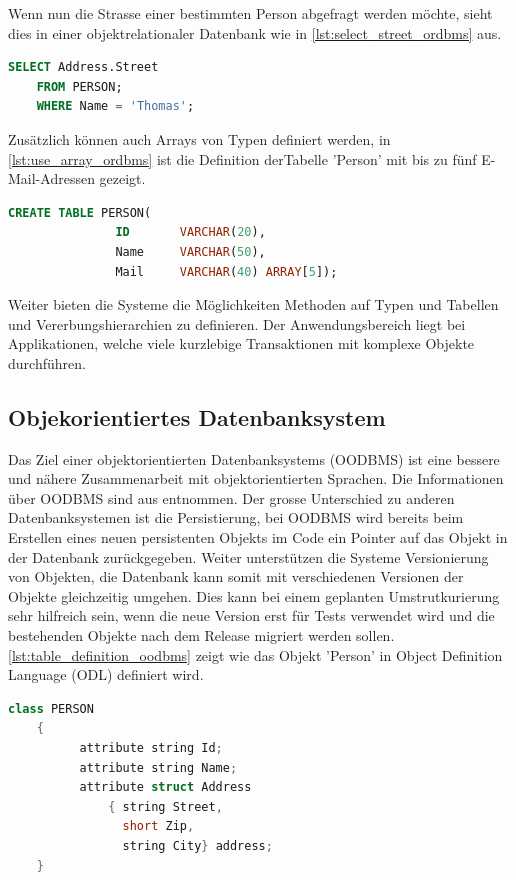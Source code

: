 Wenn nun die Strasse einer bestimmten Person abgefragt werden möchte, sieht dies in einer objektrelationaler Datenbank wie in \autoref{lst:select_street_ordbms} aus.

\begin{lstlisting}[language=SQL, caption=Abfrage in objektrelationalem Datenbanksystem, label=lst:select_street_ordbms]  
    SELECT Address.Street
    FROM PERSON;
    WHERE Name = 'Thomas';
\end{lstlisting}

Zusätzlich können auch Arrays von Typen definiert werden, in \autoref{lst:use_array_ordbms} ist die Definition derTabelle 'Person' mit 
bis zu fünf E-Mail-Adressen gezeigt.

\begin{lstlisting}[language=SQL, caption=Verwendung von Array in objektrelationalem Datenbanksystem, label=lst:use_array_ordbms]  
    CREATE TABLE PERSON(
               ID       VARCHAR(20),
               Name     VARCHAR(50),
               Mail     VARCHAR(40) ARRAY[5]);
\end{lstlisting}

Weiter bieten die Systeme die Möglichkeiten Methoden auf Typen und Tabellen und Vererbungshierarchien zu definieren. Der Anwendungsbereich 
liegt bei Applikationen, welche viele kurzlebige Transaktionen mit komplexe Objekte durchführen.

\subsection{Objekorientiertes Datenbanksystem}\label{object_db}
Das Ziel einer objektorientierten Datenbanksystems (OODBMS) ist eine bessere und nähere Zusammenarbeit mit objektorientierten Sprachen.
Die Informationen über OODBMS sind aus \cite{limited2010introduction} entnommen. Der grosse Unterschied zu anderen Datenbanksystemen
ist die Persistierung, bei OODBMS wird bereits beim Erstellen eines neuen persistenten Objekts im Code ein Pointer auf das Objekt in der Datenbank zurückgegeben. 
Weiter unterstützen die Systeme Versionierung von Objekten, die Datenbank kann somit mit verschiedenen Versionen der Objekte gleichzeitig umgehen. 
Dies kann bei einem geplanten Umstrutkurierung sehr hilfreich sein, wenn die neue Version erst für Tests verwendet wird und die bestehenden Objekte nach dem 
Release migriert werden sollen. \autoref{lst:table_definition_oodbms} zeigt wie das Objekt 'Person' in Object Definition Language (ODL) definiert wird.

\begin{lstlisting}[language=C++, caption=Objektdefinition in objektorientierem Datenbanksystem, label=lst:table_definition_oodbms]  
    class PERSON
    {
          attribute string Id;
          attribute string Name;
          attribute struct Address
              { string Street,
                short Zip,
                string City} address;
    }
\end{lstlisting}

